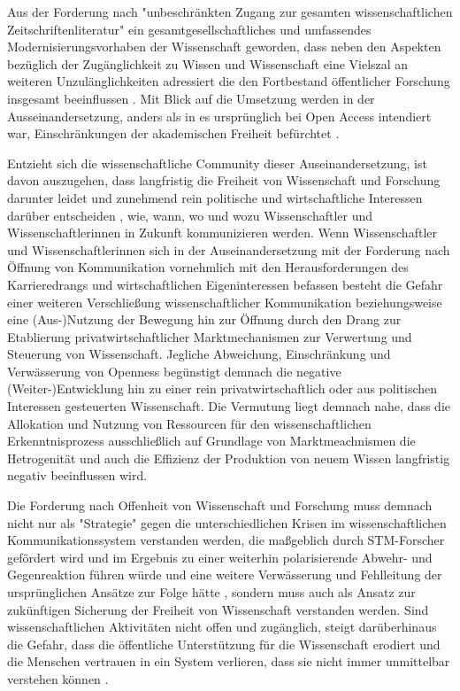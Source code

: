 Aus der Forderung nach "unbeschränkten Zugang zur gesamten wissenschaftlichen Zeitschriftenliteratur" \cite{boai_2012} ein gesamtgesellschaftliches und umfassendes Modernisierungsvorhaben der Wissenschaft geworden, dass neben den Aspekten bezüglich der Zugänglichkeit zu Wissen und Wissenschaft eine Vielszal an weiteren Unzulänglichkeiten adressiert die den Fortbestand öffentlicher Forschung insgesamt beeinflussen \cite{brembs2015open}. Mit Blick auf die Umsetzung werden in der Ausseinandersetzung, anders als in es ursprünglich bei Open Access intendiert war, Einschränkungen der akademischen Freiheit befürchtet \cite{hagner_2015_sache_buches}.

Entzieht sich die wissenschaftliche Community dieser Auseinandersetzung, ist davon auszugehen, dass langfristig die Freiheit von Wissenschaft und Forschung darunter leidet und zunehmend rein politische und wirtschaftliche Interessen darüber entscheiden \cite{Warnke_2012}, wie, wann, wo und wozu Wissenschaftler und Wissenschaftlerinnen in Zukunft kommunizieren werden. Wenn Wissenschaftler und Wissenschaftlerinnen sich in der Auseinandersetzung mit der Forderung nach Öffnung von Kommunikation vornehmlich mit den Herausforderungen des Karrieredrangs und wirtschaftlichen Eigeninteressen befassen \cite{resnik_2005_ethics} besteht die Gefahr einer weiteren Verschließung wissenschaftlicher Kommunikation beziehungsweise eine (Aus-)Nutzung der Bewegung hin zur Öffnung durch den Drang zur Etablierung privatwirtschaftlicher Marktmechanismen zur Verwertung und Steuerung von Wissenschaft. Jegliche Abweichung, Einschränkung und Verwässerung von Openness begünstigt demnach die negative (Weiter-)Entwicklung hin zu einer rein privatwirtschaftlich oder aus politischen Interessen gesteuerten Wissenschaft. Die Vermutung liegt demnach nahe, dass die Allokation und Nutzung von Ressourcen für den wissenschaftlichen Erkenntnisprozess ausschließlich auf Grundlage von Marktmeachnismen die Hetrogenität und auch die Effizienz der Produktion von neuem Wissen langfristig negativ beeinflussen wird.

Die Forderung nach Offenheit von Wissenschaft und Forschung muss demnach nicht nur als "Strategie" gegen die unterschiedlichen Krisen im wissenschaftlichen Kommunikationssystem verstanden werden, die maßgeblich durch STM-Forscher gefördert wird und im Ergebnis zu einer weiterhin polarisierende Abwehr- und Gegenreaktion führen würde und eine weitere Verwässerung und Fehlleitung der ursprünglichen Ansätze zur Folge hätte \cite{naeder_2010_open}, sondern muss auch als Ansatz zur zukünftigen Sicherung der Freiheit von Wissenschaft verstanden werden. Sind wissenschaftlichen Aktivitäten nicht offen und zugänglich, steigt darüberhinaus die Gefahr, dass die öffentliche Unterstützung für die Wissenschaft erodiert und die Menschen vertrauen in ein System verlieren, dass sie nicht immer unmittelbar verstehen können \cite{resnik_2005_ethics}.

